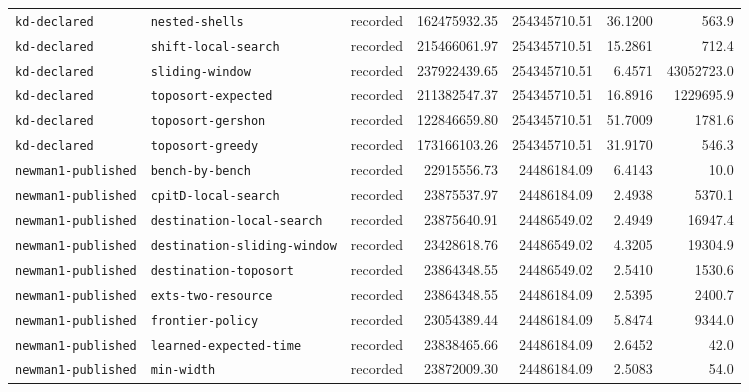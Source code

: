 \begin{longtable}{>{\raggedright\arraybackslash}p{}>{\raggedright\arraybackslash}p{}r r r r r}
\texttt{kd\allowbreak-declared} & \texttt{nested\allowbreak-shells} & recorded & 162475932.35 & 254345710.51 & 36.1200 & 563.9 \\
\texttt{kd\allowbreak-declared} & \texttt{shift\allowbreak-local\allowbreak-search} & recorded & 215466061.97 & 254345710.51 & 15.2861 & 712.4 \\
\texttt{kd\allowbreak-declared} & \texttt{sliding\allowbreak-window} & recorded & 237922439.65 & 254345710.51 & 6.4571 & 43052723.0 \\
\texttt{kd\allowbreak-declared} & \texttt{toposort\allowbreak-expected} & recorded & 211382547.37 & 254345710.51 & 16.8916 & 1229695.9 \\
\texttt{kd\allowbreak-declared} & \texttt{toposort\allowbreak-gershon} & recorded & 122846659.80 & 254345710.51 & 51.7009 & 1781.6 \\
\texttt{kd\allowbreak-declared} & \texttt{toposort\allowbreak-greedy} & recorded & 173166103.26 & 254345710.51 & 31.9170 & 546.3 \\
\texttt{newman1\allowbreak-published} & \texttt{bench\allowbreak-by\allowbreak-bench} & recorded & 22915556.73 & 24486184.09 & 6.4143 & 10.0 \\
\texttt{newman1\allowbreak-published} & \texttt{cpitD\allowbreak-local\allowbreak-search} & recorded & 23875537.97 & 24486184.09 & 2.4938 & 5370.1 \\
\texttt{newman1\allowbreak-published} & \texttt{destination\allowbreak-local\allowbreak-search} & recorded & 23875640.91 & 24486549.02 & 2.4949 & 16947.4 \\
\texttt{newman1\allowbreak-published} & \texttt{destination\allowbreak-sliding\allowbreak-window} & recorded & 23428618.76 & 24486549.02 & 4.3205 & 19304.9 \\
\texttt{newman1\allowbreak-published} & \texttt{destination\allowbreak-toposort} & recorded & 23864348.55 & 24486549.02 & 2.5410 & 1530.6 \\
\texttt{newman1\allowbreak-published} & \texttt{exts\allowbreak-two\allowbreak-resource} & recorded & 23864348.55 & 24486184.09 & 2.5395 & 2400.7 \\
\texttt{newman1\allowbreak-published} & \texttt{frontier\allowbreak-policy} & recorded & 23054389.44 & 24486184.09 & 5.8474 & 9344.0 \\
\texttt{newman1\allowbreak-published} & \texttt{learned\allowbreak-expected\allowbreak-time} & recorded & 23838465.66 & 24486184.09 & 2.6452 & 42.0 \\
\texttt{newman1\allowbreak-published} & \texttt{min\allowbreak-width} & recorded & 23872009.30 & 24486184.09 & 2.5083 & 54.0 \\

\end{longtable}
